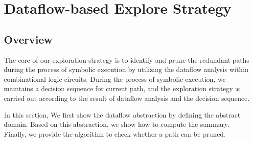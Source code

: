 \documentclass[conference]{IEEEtran}
\begin{document}
\vspace{-3mm}
\section{Dataflow-based Explore Strategy}
\label{sec:strategy}
\subsection{Overview}

The core of our exploration strategy is to identify and prune the redundant paths during the process of symbolic execution by utilizing the dataflow analysis within combinational logic circuits. During the process of symbolic execution, we maintains a decision sequence for current path, and the exploration strategy is carried out according to the result of dataflow analysis and the decision sequence.%

In this section,  We first show the dataflow abstraction by defining the abstract domain. Based on this abstraction, we show how to compute the summary. Finally, we provide the algorithm to check whether a path can be pruned.
\end{document}
